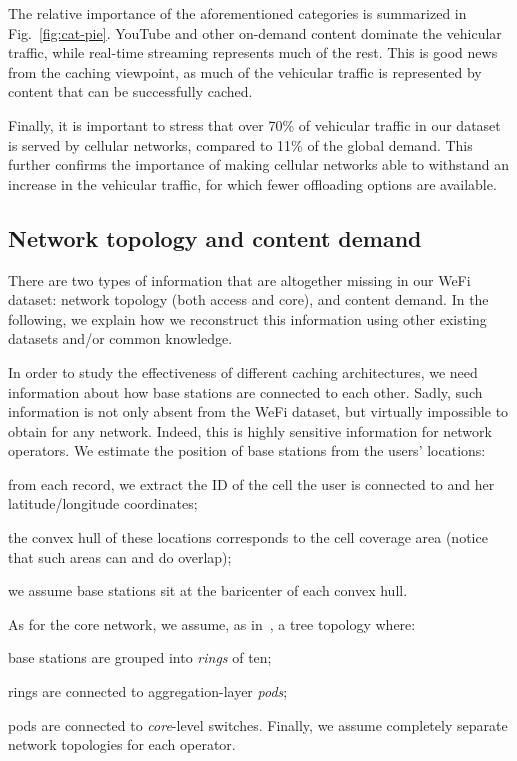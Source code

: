 \documentclass{sig-alternate-05-2015}
\newcommand{\Fig}[1]{Fig.~\ref{fig:#1}}
\let\tempone\itemize
\let\temptwo\enditemize
\renewenvironment{itemize}{\tempone\addtolength{\itemsep}{-0.7\baselineskip}}{\temptwo}
\let\tempthree\enumerate
\let\tempfour\endenumerate
\renewenvironment{enumerate}{\tempthree\addtolength{\itemsep}{-0.7\baselineskip}}{\tempfour}
\begin{document}
The relative importance of the aforementioned categories is summarized in \Fig{cat-pie}. YouTube and other on-demand content dominate the vehicular traffic, while real-time streaming represents much of the rest. This is good news from the caching viewpoint, as much of the vehicular traffic is represented by content that can be successfully cached.

Finally, it is important to stress that over 70\% of vehicular traffic in our dataset is served by cellular networks, compared to 11\% of the global demand. This further confirms the importance of making cellular networks able to withstand an increase in the vehicular traffic, for which fewer offloading options are available.

\subsection{Network topology and content demand}
\label{sec:complement}

There are two types of information that are altogether missing in our WeFi dataset: network topology (both access and core), and content demand. In the following, we explain how we reconstruct this information using other existing datasets and/or common knowledge.

In order to study the effectiveness of different caching architectures, we need information about how base stations are connected to each other. Sadly, such information is not only absent from the WeFi dataset, but virtually impossible to obtain for any network. Indeed, this is highly sensitive information for network operators.
We estimate the position of base stations from the users' locations:
\begin{enumerate}
\item from each record, we extract the ID of the cell the user is connected to and her latitude/longitude coordinates;
\item the convex hull of these locations corresponds to the cell coverage area (notice that such areas can and do overlap);
\item we assume base stations sit at the baricenter of each convex hull.
\end{enumerate}

As for the core network, we assume, as in~\cite{softcell}, a tree topology where:
\begin{itemize}
\item base stations are grouped into {\em rings} of ten;
\item rings are connected to aggregation-layer {\em pods};
\item pods are connected to {\em core}-level switches.
\end{itemize}
Finally, we assume completely separate network topologies for each operator.
\end{document}
